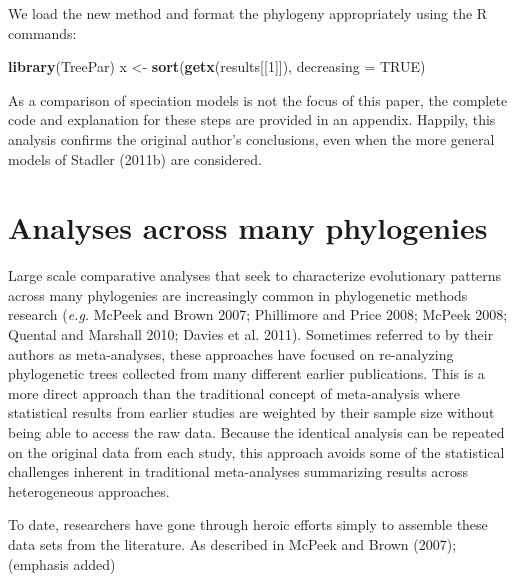 \documentclass[author-year, 8pt, 3p]{elsarticle} %
\newenvironment{Shaded}{}{}
\newcommand{\KeywordTok}[1]{\textcolor[rgb]{0.00,0.44,0.13}{\textbf{{#1}}}}
\newcommand{\DataTypeTok}[1]{\textcolor[rgb]{0.56,0.13,0.00}{{#1}}}
\newcommand{\DecValTok}[1]{\textcolor[rgb]{0.25,0.63,0.44}{{#1}}}
\newcommand{\OtherTok}[1]{\textcolor[rgb]{0.00,0.44,0.13}{{#1}}}
\newcommand{\NormalTok}[1]{{#1}}
\begin{document}
We load the new method and format the phylogeny appropriately using the
R commands:

\begin{Shaded}
\begin{Highlighting}[]
\KeywordTok{library}\NormalTok{(TreePar)}
\NormalTok{x <- }\KeywordTok{sort}\NormalTok{(}\KeywordTok{getx}\NormalTok{(results[[}\DecValTok{1}\NormalTok{]]), }\DataTypeTok{decreasing =} \OtherTok{TRUE}\NormalTok{)}
\end{Highlighting}
\end{Shaded}
As a comparison of speciation models is not the focus of this paper, the
complete code and explanation for these steps are provided in an
appendix. Happily, this analysis confirms the original author's
conclusions, even when the more general models of Stadler (2011b) are
considered.

\section{Analyses across many phylogenies}

Large scale comparative analyses that seek to characterize evolutionary
patterns across many phylogenies are increasingly common in phylogenetic
methods research (\emph{e.g.} McPeek and Brown 2007; Phillimore and
Price 2008; McPeek 2008; Quental and Marshall 2010; Davies et al. 2011).
Sometimes referred to by their authors as meta-analyses, these
approaches have focused on re-analyzing phylogenetic trees collected
from many different earlier publications. This is a more direct approach
than the traditional concept of meta-analysis where statistical results
from earlier studies are weighted by their sample size without being
able to access the raw data. Because the identical analysis can be
repeated on the original data from each study, this approach avoids some
of the statistical challenges inherent in traditional meta-analyses
summarizing results across heterogeneous approaches.

To date, researchers have gone through heroic efforts simply to assemble
these data sets from the literature. As described in McPeek and Brown
(2007); (emphasis added)
\end{document}
